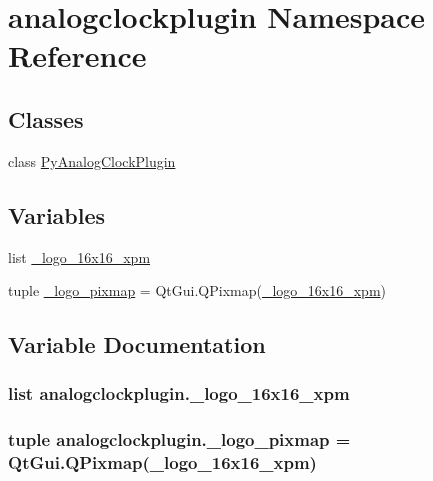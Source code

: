 \hypertarget{namespaceanalogclockplugin}{}\section{analogclockplugin Namespace Reference}
\label{namespaceanalogclockplugin}
\subsection*{Classes}
\begin{DoxyCompactItemize}
\item 
class \hyperlink{classanalogclockplugin_1_1PyAnalogClockPlugin}{Py\+Analog\+Clock\+Plugin}
\end{DoxyCompactItemize}
\subsection*{Variables}
\begin{DoxyCompactItemize}
\item 
list \hyperlink{namespaceanalogclockplugin_a324e78af45296207f4b110c4c62ee9c3}{\+\_\+logo\+\_\+16x16\+\_\+xpm}
\item 
tuple \hyperlink{namespaceanalogclockplugin_a98f3f366a3dad57f2d54ae82d921b8b6}{\+\_\+logo\+\_\+pixmap} = Qt\+Gui.\+Q\+Pixmap(\hyperlink{namespaceanalogclockplugin_a324e78af45296207f4b110c4c62ee9c3}{\+\_\+logo\+\_\+16x16\+\_\+xpm})
\end{DoxyCompactItemize}


\subsection{Variable Documentation}
\hypertarget{namespaceanalogclockplugin_a324e78af45296207f4b110c4c62ee9c3}{}
\subsubsection[{\+\_\+logo\+\_\+16x16\+\_\+xpm}]{\setlength{\rightskip}{0pt plus 5cm}list analogclockplugin.\+\_\+logo\+\_\+16x16\+\_\+xpm}\label{namespaceanalogclockplugin_a324e78af45296207f4b110c4c62ee9c3}
\hypertarget{namespaceanalogclockplugin_a98f3f366a3dad57f2d54ae82d921b8b6}{}
\subsubsection[{\+\_\+logo\+\_\+pixmap}]{\setlength{\rightskip}{0pt plus 5cm}tuple analogclockplugin.\+\_\+logo\+\_\+pixmap = Qt\+Gui.\+Q\+Pixmap({\bf \+\_\+logo\+\_\+16x16\+\_\+xpm})}\label{namespaceanalogclockplugin_a98f3f366a3dad57f2d54ae82d921b8b6}
